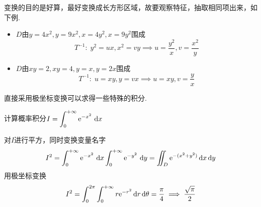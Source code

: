 \par 变换的目的是好算，最好变换成长方形区域，故要观察特征，抽取相同项出来，如下例.
\begin{example}
\begin{itemize}
	\item $D$由$y=4x^2,y=9x^2,x=4y^2,x=9y^2$围成
	\[T^{-1}:\;y^2=ux,x^2=vy\implies u=\frac{y^2}{x},v=\frac{x^2}{y}\]
	\item $D$由$xy=2,xy=4,y=x,y=2x$围成
	\[T^{-1}:\;u=xy,y=vx\implies u=xy,v=\frac{y}{x}\]
\end{itemize}
\end{example}
\par 直接采用极坐标变换可以求得一些特殊的积分.
\begin{example}
计算概率积分$I=\displaystyle\int_{0}^{+\infty}{\mathrm{e}^{-x^2}}\,\,\mathrm{d} x$
\end{example}
\begin{analysis}
对$I$进行平方，同时变换变量名字
\[I^2=\displaystyle\int_{0}^{+\infty}{\mathrm{e}^{-x^2}}\,\,\mathrm{d} x\displaystyle\int_{0}^{+\infty}{\mathrm{e}^{-y^2}}\,\,\mathrm{d} y=\iint_D\mathrm{e}^{-(x^2+y^2)}\,\mathrm{d} x\,\mathrm{d} y\]
用极坐标变换
\[I^2=\int_0^{2\pi}\int_0^{+\infty}r\mathrm{e}^{-r^2}\,\mathrm{d} r\,\mathrm{d}\theta=\frac{\pi}{4}\implies\frac{\sqrt{\pi}}{2}\]
\end{analysis}

